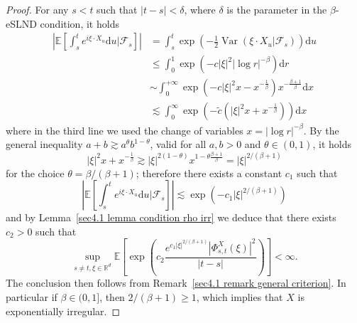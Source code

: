 \documentclass[10pt]{article}
\newcommand{\mathd}{\mathrm{d}}
\newcommand{\nobracket}{}
\newcommand{\tmop}[1]{\ensuremath{\operatorname{#1}}}
\begin{document}
\begin{proof}
  For any $s < t$ such that $| t - s | < \delta$, where $\delta$ is the
  parameter in the $\beta$\mbox{-}eSLND condition, it holds
%  
  \begin{align*}
    \left| \mathbb{E} \left[ \int_s^t e^{i \xi \cdot X_u} \mathd u |
    \mathcal{F}_s \nobracket \right] \right| & = \int_s^t \exp \left( -
    \frac{1}{2} \tmop{Var} (\xi \cdot X_u | \mathcal{F}_s \nobracket) \right)
    \mathd u\\
    & \leqslant \int_0^1 \exp (- c | \xi |^2 | \log r |^{- \beta}) \mathd r\\
    & \sim \int_0^{+ \infty} \exp \left( - c | \xi |^2 x - x^{-
    \frac{1}{\beta}} \right) x^{- \frac{\beta + 1}{\beta}} \mathd x\\
    & \lesssim \int_0^{\infty} \exp \left( - \tilde{c} \left( | \xi |^2 x +
    x^{- \frac{1}{\beta}} \right) \right) \mathd x
  \end{align*}
%  
  where in the third line we used the change of variables $x = | \log r |^{-
  \beta}$. By the general inequality $a + b \gtrsim a^{\theta} b^{1 -
  \theta}$, valid for all $a, b > 0$ and $\theta \in (0, 1)$, it holds
  \[ | \xi |^2 x + x^{- \frac{1}{\beta}} \gtrsim | \xi |^{2 (1 - \theta)} x^{1
     - \theta \frac{\beta + 1}{\beta}} = | \xi |^{2 / (\beta + 1)} \]
  for the choice $\theta = \beta / (\beta + 1)$; therefore there exists a
  constant $c_1$ such that
  \[ \left| \mathbb{E} \left[ \int_s^t e^{i \xi \cdot X_u} \mathd u |
     \mathcal{F}_s \nobracket \right] \right| \lesssim \exp (- c_1 | \xi |^{2
     / (\beta + 1)}) \]
  and by Lemma~\ref{sec4.1 lemma condition rho irr} we deduce that there
  exists $c_2 > 0$ such that
  \[ \sup_{s \neq t, \xi \in \mathbb{R}^d} \mathbb{E} \left[ \exp \left( c_2 
     \frac{e^{c_1 | \xi |^{2 / (\beta + 1)}} | \Phi_{s, t}^X (\xi) |^2}{| t -
     s |} \right) \right] < \infty . \]
  The conclusion then follows from Remark~\ref{sec4.1 remark general
  criterion}. In particular if $\beta \in (0, 1]$, then $2 / (\beta + 1)
  \geqslant 1$, which implies that $X$ is exponentially irregular.
\end{proof}
\end{document}
